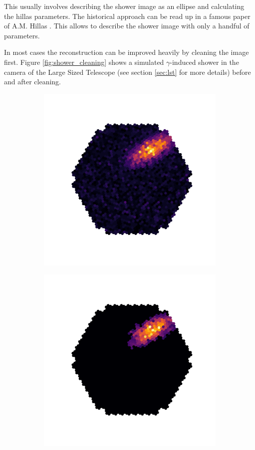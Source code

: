 This usually involves describing the 
shower image as an ellipse and calculating the hillas parameters.
The historical approach can be read up in 
a famous paper of A.M. Hillas \cite{hillas_params}.
This allows to describe the shower image with only a handful of parameters.

In most cases the reconstruction can be improved heavily by cleaning the image first.
Figure \ref{fig:shower_cleaning} shows a simulated $\gamma$-induced shower 
in the camera of the Large Sized Telescope (see section \ref{sec:lst} for more details)
before and after cleaning.

\begin{figure}
	\centering
	\begin{subfigure}{.5\textwidth}
  		\centering
  		\includegraphics[width=.9\linewidth]{Plots/hillas_raw.pdf}
	\end{subfigure}%
	\begin{subfigure}{.5\textwidth}
 		\centering
		\includegraphics[width=.9\linewidth]{Plots/hillas_cleaned.pdf}

\end{subfigure}
\end{figure}

